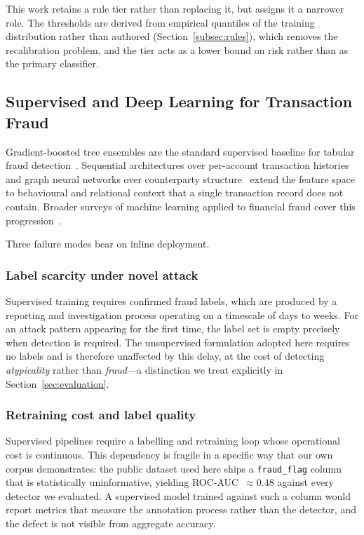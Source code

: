 \documentclass[conference]{IEEEtran}
\begin{document}
This work retains a rule tier rather than replacing it, but assigns it
a narrower role. The thresholds are derived from empirical quantiles of
the training distribution rather than authored
(Section~\ref{subsec:rules}), which removes the recalibration problem,
and the tier acts as a lower bound on risk rather than as the primary
classifier.

\subsection{Supervised and Deep Learning for Transaction Fraud}
\label{subsec:rw_supervised}

Gradient-boosted tree ensembles are the standard supervised baseline
for tabular fraud detection~\cite{chen2016}. Sequential architectures
over per-account transaction histories~\cite{jurgovsky2018} and graph
neural networks over counterparty structure~\cite{dou2020} extend the
feature space to behavioural and relational context that a single
transaction record does not contain. Broader surveys of machine
learning applied to financial fraud cover this
progression~\cite{adewumi2017}.

Three failure modes bear on inline deployment.

\subsubsection{Label scarcity under novel attack}
Supervised training requires confirmed fraud labels, which are produced
by a reporting and investigation process operating on a timescale of
days to weeks. For an attack pattern appearing for the first time, the
label set is empty precisely when detection is required. The
unsupervised formulation adopted here requires no labels and is
therefore unaffected by this delay, at the cost of detecting
\emph{atypicality} rather than \emph{fraud}---a distinction we treat
explicitly in Section~\ref{sec:evaluation}.

\subsubsection{Retraining cost and label quality}
Supervised pipelines require a labelling and retraining loop whose
operational cost is continuous. This dependency is fragile in a
specific way that our own corpus demonstrates: the public dataset used
here ships a \texttt{fraud\_flag} column that is statistically
uninformative, yielding ROC-AUC~$\approx 0.48$ against every detector
we evaluated. A supervised model trained against such a column would
report metrics that measure the annotation process rather than the
detector, and the defect is not visible from aggregate accuracy.
\end{document}
